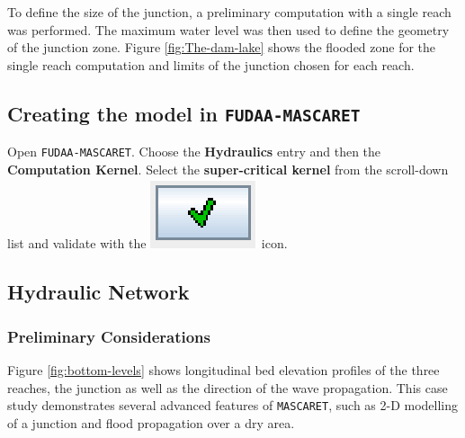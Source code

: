 \documentclass[a4paper,12pt]{article}
\begin{document}
\vspace{0.5cm}

To define the size of the junction, a preliminary computation
with a single reach was performed. The maximum water level was then used
to define the geometry of the junction zone. Figure \ref{fig:The-dam-lake} shows the flooded zone for the
single reach computation and limits of the junction chosen for each reach.

\vspace{0.5cm}



\subsection{Creating the model in \texttt{FUDAA-MASCARET}}

\hspace{0.5cm} Open \texttt{FUDAA-MASCARET}. Choose the \textbf{Hydraulics}
entry and then the \textbf{Computation Kernel}. Select the \textbf{super-critical kernel} from the scroll-down
list and validate with the \includegraphics[scale=0.6]{valid}
icon. 


\subsection{Hydraulic Network}


\subsubsection{Preliminary Considerations  
 }

\hspace{0.5cm} Figure \ref{fig:bottom-levels} shows longitudinal bed elevation profiles of the three reaches, the junction as well as the direction of the wave propagation. This
case study demonstrates several advanced features of \texttt{MASCARET}, such as 2-D modelling of a junction and flood propagation
over a dry area. 
\end{document}
